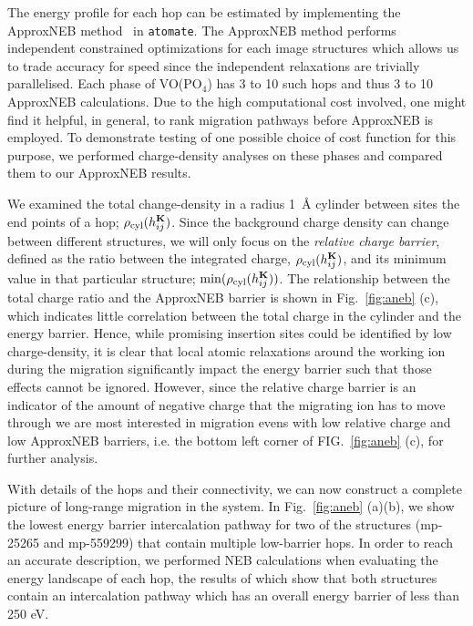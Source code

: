\documentclass[reprint,preprintnumbers,amsmath,amssymb,aps,prl]{revtex4-1}
\begin{document}
The energy profile for each hop can be estimated by implementing the ApproxNEB method~\cite{Rong2016Aug} in \texttt{atomate}.
The ApproxNEB method performs independent constrained optimizations for each image structures which allows us to trade accuracy for speed since the independent relaxations are trivially parallelised.
Each phase of VO(PO$_4$) has 3 to 10 such hops and thus 3 to 10 ApproxNEB calculations. 
Due to the high computational cost involved, one might find it helpful, in general, to rank migration pathways before ApproxNEB is employed. 
To demonstrate testing of one possible choice of cost function for this purpose, we performed charge-density analyses on these phases and compared them to our ApproxNEB results.

We examined the total change-density in a radius 1~\AA{} cylinder between sites the end points of a hop; $\rho_{\rm cyl}(h_{ij}^{\mathbf{K}})$.
Since the background charge density can change between different structures, we will only focus on the {\it relative charge barrier}, defined as the ratio between the integrated charge, $\rho_{\rm cyl}(h_{ij}^{\mathbf{K}})$, and its minimum value in that particular structure; $\min(\rho_{\rm cyl}(h_{ij}^{\mathbf{K}}))$.
The relationship between the total charge ratio and the ApproxNEB barrier is shown in Fig.~\ref{fig:aneb} (c), which indicates little correlation between the total charge in the cylinder and the energy barrier. Hence, while promising insertion sites could be identified by low charge-density, it is clear that local atomic relaxations around the working ion during the migration significantly impact the energy barrier such that those effects cannot be ignored. 
However, since the relative charge barrier is an indicator of the amount of negative charge that the migrating ion has to move through we are most interested in migration evens with low relative charge and low ApproxNEB barriers, i.e. the bottom left corner of FIG.~\ref{fig:aneb} (c), for further analysis.

With details of the hops and their connectivity, we can now construct a complete picture of long-range migration in the system. 
In Fig.~\ref{fig:aneb} (a)(b), we show the lowest energy barrier intercalation pathway for two of the structures (mp-25265 and mp-559299) that contain multiple low-barrier hops. In order to reach an accurate description, we performed NEB calculations when evaluating the energy landscape of each hop, the results of which show that both structures contain  an intercalation pathway which has an overall energy barrier of less than 250 eV.
\end{document}
